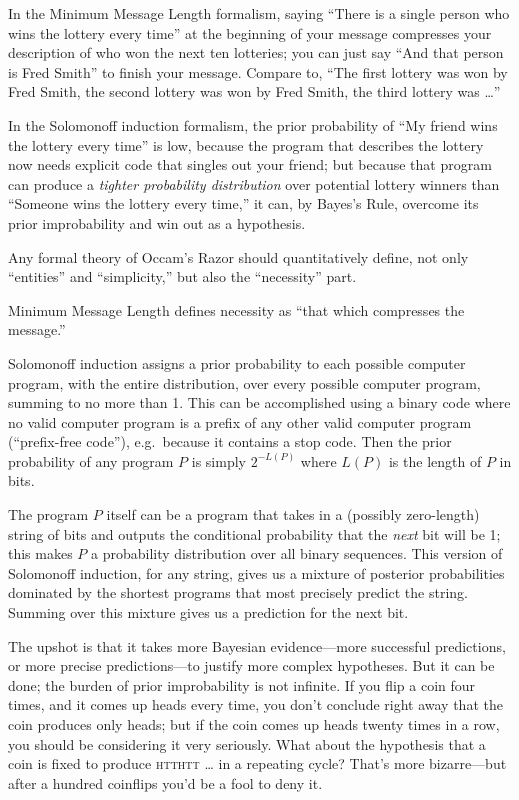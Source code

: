 {
 In the Minimum Message Length formalism, saying
``There is a single person who wins the lottery every
time'' at the beginning of your message compresses
your description of who won the next ten lotteries; you can just say
``And that person is Fred Smith'' to
finish your message. Compare to, ``The first lottery
was won by Fred Smith, the second lottery was won by Fred Smith, the
third lottery was \ldots''}

{
 In the Solomonoff induction formalism, the prior probability of
``My friend wins the lottery every
time'' is low, because the program that describes the
lottery now needs explicit code that singles out your friend; but
because that program can produce a \textit{tighter probability
distribution} over potential lottery winners than
``Someone wins the lottery every
time,'' it can, by Bayes's Rule,
overcome its prior improbability and win out as a hypothesis.}

{
 Any formal theory of Occam's Razor should
quantitatively define, not only
``entities'' and
``simplicity,'' but also the
``necessity'' part.}

{
 Minimum Message Length defines necessity as
``that which compresses the
message.''}

{
 Solomonoff induction assigns a prior probability to each possible
computer program, with the entire distribution, over every possible
computer program, summing to no more than 1. This can be accomplished
using a binary code where no valid computer program is a prefix of any
other valid computer program (``prefix-free
code''), e.g.~because it contains a stop code. Then
the prior probability of any program $P$ is simply
$2^{-L(P)}$ where $L(P)$ is the length of $P$ in bits.}

{
 The program $P$ itself can be a program that takes in a (possibly
zero-length) string of bits and outputs the conditional probability
that the \textit{next} bit will be 1; this makes $P$ a probability
distribution over all binary sequences. This version of Solomonoff
induction, for any string, gives us a mixture of posterior
probabilities dominated by the shortest programs that most precisely
predict the string. Summing over this mixture gives us a prediction for
the next bit.}

{
 The upshot is that it takes more Bayesian evidence---more
successful predictions, or more precise predictions---to justify more
complex hypotheses. But it can be done; the burden of prior
improbability is not infinite. If you flip a coin four times, and it
comes up heads every time, you don't conclude right
away that the coin produces only heads; but if the coin comes up heads
twenty times in a row, you should be considering it very seriously.
What about the hypothesis that a coin is fixed to produce \textsc{htthtt} \ldots
in a repeating cycle? That's more bizarre---but after a
hundred coinflips you'd be a fool to deny it.}

